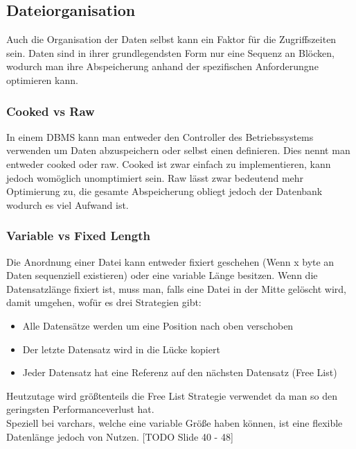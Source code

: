 \documentclass{article}
\begin{document}
	\subsection{Dateiorganisation}
	Auch die Organisation der Daten selbst kann ein Faktor für die Zugriffszeiten sein. Daten sind in ihrer grundlegendsten Form nur eine Sequenz an Blöcken, wodurch man ihre Abspeicherung anhand der spezifischen Anforderungne optimieren kann.
	\subsubsection{Cooked vs Raw}
	In einem DBMS kann man entweder den Controller des Betriebssystems verwenden um Daten abzuspeichern oder selbst einen definieren. Dies nennt man entweder cooked oder raw. Cooked ist zwar einfach zu implementieren, kann jedoch womöglich unomptimiert sein. Raw lässt zwar bedeutend mehr Optimierung zu, die gesamte Abspeicherung obliegt jedoch der Datenbank wodurch es viel Aufwand ist.
	\subsubsection{Variable vs Fixed Length}
	Die Anordnung einer Datei kann entweder fixiert geschehen (Wenn x byte an Daten sequenziell existieren) oder eine variable Länge besitzen. Wenn die Datensatzlänge fixiert ist, muss man, falls eine Datei in der Mitte gelöscht wird, damit umgehen, wofür es drei Strategien gibt:
	\begin{itemize}
		\item{Alle Datensätze werden um eine Position nach oben verschoben}
		\item{Der letzte Datensatz wird in die Lücke kopiert}
		\item{Jeder Datensatz hat eine Referenz auf den nächsten Datensatz (Free List)}
	\end{itemize}
	Heutzutage wird größtenteils die Free List Strategie verwendet da man so den geringsten Performanceverlust hat. \\
	Speziell bei varchars, welche eine variable Größe haben können, ist eine flexible Datenlänge jedoch von Nutzen. [TODO Slide 40 - 48]













	
\end{document}
